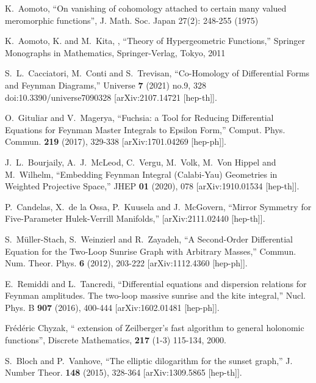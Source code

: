 \documentclass[a4paper,12pt]{article}
\numberwithin{equation}{section}
\numberwithin{figure}{section}
\begin{document}
\begin{thebibliography}{99}
   K.~Aomoto, ``On vanishing of cohomology attached to
    certain many valued meromorphic functions'', J. Math. Soc. Japan
    27(2): 248-255 (1975)

     K.~Aomoto, K. and M.~Kita, , ``Theory of Hypergeometric Functions,'' Springer Monographs in Mathematics, Springer-Verlag, Tokyo, 2011
    
S.~L.~Cacciatori, M.~Conti and S.~Trevisan,
``Co-Homology of Differential Forms and Feynman Diagrams,''
Universe \textbf{7} (2021) no.9, 328
doi:10.3390/universe7090328
[arXiv:2107.14721 [hep-th]].
  
O.~Gituliar and V.~Magerya,
``Fuchsia: a Tool for Reducing Differential Equations for Feynman Master Integrals to Epsilon Form,''
Comput. Phys. Commun. \textbf{219} (2017), 329-338
[arXiv:1701.04269 [hep-ph]].

J.~L.~Bourjaily, A.~J.~McLeod, C.~Vergu, M.~Volk, M.~Von Hippel and M.~Wilhelm,
``Embedding Feynman Integral (Calabi-Yau) Geometries in Weighted Projective Space,''
JHEP \textbf{01} (2020), 078
[arXiv:1910.01534 [hep-th]].

P.~Candelas, X.~de la Ossa, P.~Kuusela and J.~McGovern,
``Mirror Symmetry for Five-Parameter Hulek-Verrill Manifolds,''
[arXiv:2111.02440 [hep-th]].

S.~M\"uller-Stach, S.~Weinzierl and R.~Zayadeh,
``A Second-Order Differential Equation for the Two-Loop Sunrise Graph with Arbitrary Masses,''
Commun. Num. Theor. Phys. \textbf{6} (2012), 203-222
[arXiv:1112.4360 [hep-ph]].

E.~Remiddi and L.~Tancredi,
``Differential equations and dispersion relations for Feynman amplitudes. The two-loop massive sunrise and the kite integral,''
Nucl. Phys. B \textbf{907} (2016), 400-444
[arXiv:1602.01481 [hep-ph]].

  Fr\'ed\'eric Chyzak, `` extension of
    Zeilberger's fast algorithm to general holonomic functions'',
Discrete Mathematics, {\bf 217} (1-3) 115-134, 2000.

S.~Bloch and P.~Vanhove,
``The elliptic dilogarithm for the sunset graph,''
J. Number Theor. \textbf{148} (2015), 328-364
[arXiv:1309.5865 [hep-th]].


\end{thebibliography}
\end{document}

